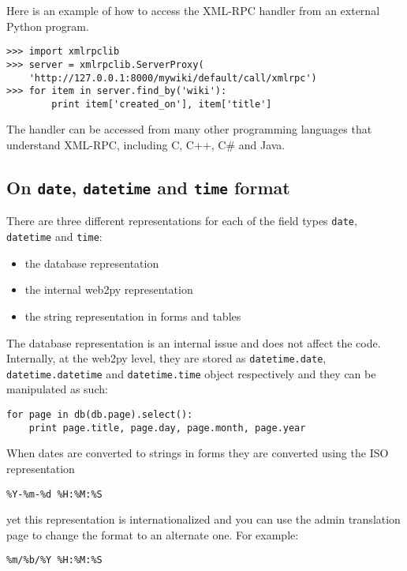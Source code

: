 \documentclass[justified,sixbynine,notoc]{tufte-book}
\def\ft{\small\tt}
\begin{document}
\begin{fullwidth}
Here is an example of how to access the XML-RPC handler from an external
Python program.
\begin{lstlisting}
>>> import xmlrpclib
>>> server = xmlrpclib.ServerProxy(
    'http://127.0.0.1:8000/mywiki/default/call/xmlrpc')
>>> for item in server.find_by('wiki'):
        print item['created_on'], item['title']
\end{lstlisting}

The handler can be accessed from many other programming languages that understand XML-RPC, including C, C++, C\# and Java.

\goodbreak\subsection{On {\ft date}, {\ft datetime} and {\ft time} format}

There are three different representations for each of the field types {\ft date}, {\ft datetime} and {\ft time}:
\begin{itemize}
\item the database representation

\item the internal web2py representation

\item the string representation in forms and tables
\end{itemize}

The database representation is an internal issue and does not affect the code. Internally, at the web2py level, they are stored as {\ft datetime.date}, {\ft datetime.datetime} and {\ft datetime.time} object respectively and they can be manipulated as such:

\begin{lstlisting}
for page in db(db.page).select():
    print page.title, page.day, page.month, page.year
\end{lstlisting}

When dates are converted to strings in forms they are converted using the ISO representation
\begin{lstlisting}
%Y-%m-%d %H:%M:%S
\end{lstlisting}
\noindent yet this representation is internationalized and you can use the admin translation page to change the format to an alternate one. For example:

\begin{lstlisting}
%m/%b/%Y %H:%M:%S
\end{lstlisting}


\end{fullwidth}
\end{document}
